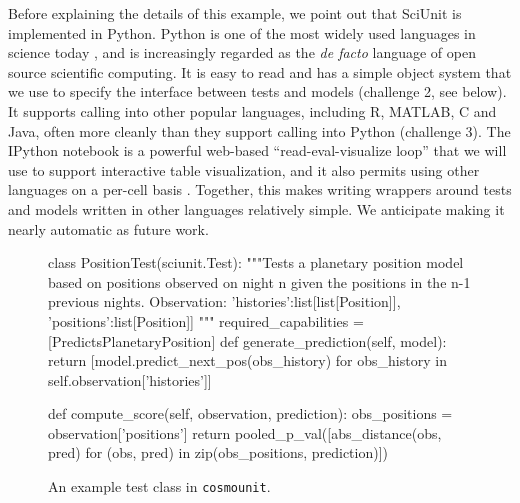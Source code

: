 \documentclass[9pt]{sig-alternate}
\begin{document}
Before explaining the details of this example, we point out that SciUnit is implemented in Python. Python is one of the most widely used languages in science today \cite{sanner1999python}, and is increasingly regarded as the \textit{de facto} language of open source scientific computing. It is easy to read and has a simple object system that we use to specify the interface between tests and models (challenge 2, see below). It supports calling into other popular languages, including R, MATLAB, C and Java, often more cleanly than they support calling into Python (challenge 3). The IPython notebook is a powerful web-based ``read-eval-visualize loop'' that we will use to support interactive table visualization, and it also permits using other languages on a per-cell basis \cite{perez2007ipython}. Together, this makes writing wrappers around tests and models written in other languages relatively simple. We anticipate making it nearly automatic as future work.
\begin{figure}[t]
\small
%
%
\begin{python}
class PositionTest(sciunit.Test):
  """Tests a planetary position model based on positions observed on night n given the positions in the n-1 previous nights.
  Observation: {
    'histories':list[list[Position]], 
    'positions':list[Position]]
  }"""
  required_capabilities = [PredictsPlanetaryPosition]
  def generate_prediction(self, model):
    return [model.predict_next_pos(obs_history)
      for obs_history 
      in self.observation['histories']]

  def compute_score(self, observation, prediction):
    obs_positions = observation['positions']
    return pooled_p_val([abs_distance(obs, pred)
      for (obs, pred) 
      in zip(obs_positions, prediction)])
\end{python}
\vspace{-12px}
\caption{\small An example test class in \texttt{cosmounit}.}
\label{fig:rate_test}
\vspace{-15px}
\end{figure}
\end{document}
